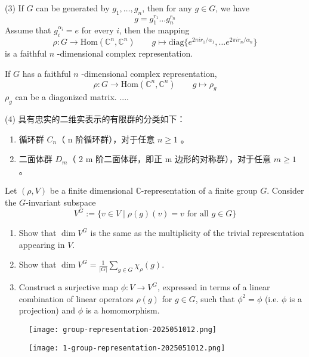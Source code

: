 (3)
If $G$ can be generated by $g_1,\dots,g_n$, then for any $g\in G$, we have
\[
g=g_1^{r_1}\dots g_n^{r_n}
\]
Assume that $g_i^{\alpha _i}=e$ for every $i$, then the mapping
\[
\rho:G\to \mathrm{Hom}(\mathbb{C}^{n},\mathbb{C}^{n})\qquad g\mapsto \mathrm{diag}\{ e^{ 2\pi ir_1/\alpha_1 },\dots e^{ 2\pi i r_n/\alpha _n } \}
\]
is a faithful $n$ -dimensional complex representation.

If $G$ has a faithful $n$ -dimensional complex representation,
\[
\rho:G\to \mathrm{Hom}(\mathbb{C}^{n},\mathbb{C}^{n})\qquad g\mapsto \rho_{g}
\]
$\rho_{g}$ can be a diagonized matrix.
....

(4)
具有忠实的二维实表示的有限群的分类如下：

\begin{enumerate}
	\item 循环群 $C_n$（ n 阶循环群），对于任意 $n \geq 1$ 。
	\item 二面体群 $D_m$（ 2 m 阶二面体群，即正 m 边形的对称群），对于任意 $m \geq 1$ 。
\end{enumerate}

\begin{remark}
Let $(\rho, V)$ be a finite dimensional $\mathbb{C}$-representation of a finite group $G$. Consider the $G$-invariant subspace
\[
V^G:=\{v \in V \mid \rho(g)(v)=v \text { for all } g \in G\}
\]	\begin{enumerate}
		\item Show that $\operatorname{dim} V^G$ is the same as the multiplicity of the trivial representation appearing in $V$.
		\item Show that $\operatorname{dim} V^G=\frac{1}{|G|} \sum_{g \in G} \chi_\rho(g)$.
		\item Construct a surjective map $\phi: V \rightarrow V^G$, expressed in terms of a linear combination of linear operators $\rho(g)$ for $g \in G$, such that $\phi^2=\phi$ (i.e. $\phi$ is a projection) and $\phi$ is a homomorphism.
	\end{enumerate}
\end{remark}
\begin{figure}[H]
\centering
\texttt{[image: group-representation-2025051012.png]}
\label{}
\end{figure}
\begin{figure}[H]
\centering
\texttt{[image: 1-group-representation-2025051012.png]}
\label{}
\end{figure}
